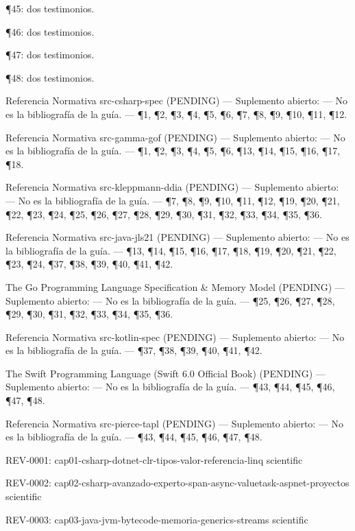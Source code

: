 \documentclass{book}
\begin{document}
\noindent ¶45: dos testimonios.

\noindent ¶46: dos testimonios.

\noindent ¶47: dos testimonios.

\noindent ¶48: dos testimonios.

\medskip

\noindent Referencia Normativa src-csharp-spec (PENDING) --- Suplemento abierto: --- No es la bibliografía de la guía. --- \P1, \P2, \P3, \P4, \P5, \P6, \P7, \P8, \P9, \P10, \P11, \P12.

\noindent Referencia Normativa src-gamma-gof (PENDING) --- Suplemento abierto: --- No es la bibliografía de la guía. --- \P1, \P2, \P3, \P4, \P5, \P6, \P13, \P14, \P15, \P16, \P17, \P18.

\noindent Referencia Normativa src-kleppmann-ddia (PENDING) --- Suplemento abierto: --- No es la bibliografía de la guía. --- \P7, \P8, \P9, \P10, \P11, \P12, \P19, \P20, \P21, \P22, \P23, \P24, \P25, \P26, \P27, \P28, \P29, \P30, \P31, \P32, \P33, \P34, \P35, \P36.

\noindent Referencia Normativa src-java-jls21 (PENDING) --- Suplemento abierto: --- No es la bibliografía de la guía. --- \P13, \P14, \P15, \P16, \P17, \P18, \P19, \P20, \P21, \P22, \P23, \P24, \P37, \P38, \P39, \P40, \P41, \P42.

\noindent The Go Programming Language Specification \& Memory Model (PENDING) --- Suplemento abierto: --- No es la bibliografía de la guía. --- \P25, \P26, \P27, \P28, \P29, \P30, \P31, \P32, \P33, \P34, \P35, \P36.

\noindent Referencia Normativa src-kotlin-spec (PENDING) --- Suplemento abierto: --- No es la bibliografía de la guía. --- \P37, \P38, \P39, \P40, \P41, \P42.

\noindent The Swift Programming Language (Swift 6.0 Official Book) (PENDING) --- Suplemento abierto: --- No es la bibliografía de la guía. --- \P43, \P44, \P45, \P46, \P47, \P48.

\noindent Referencia Normativa src-pierce-tapl (PENDING) --- Suplemento abierto: --- No es la bibliografía de la guía. --- \P43, \P44, \P45, \P46, \P47, \P48.

\noindent REV-0001: cap01-csharp-dotnet-clr-tipos-valor-referencia-linq scientific

\noindent REV-0002: cap02-csharp-avanzado-experto-span-async-valuetask-aspnet-proyectos scientific

\noindent REV-0003: cap03-java-jvm-bytecode-memoria-generics-streams scientific
\end{document}
